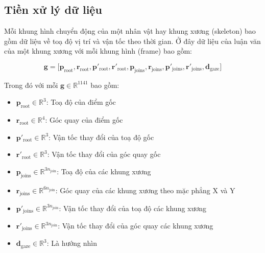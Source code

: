 \subsection{Tiền xử lý dữ liệu}


Mỗi khung hình chuyển động của một nhân vật hay khung xương (skeleton) bao gồm dữ liệu về toạ độ vị trí và vận tốc theo thời gian.
Ở đây dữ liệu của luận văn của một khung xương với mỗi khung hình (frame) bao gồm:

\begin{equation} \label{eq:gesturevector}
	\mathbf{g} = \Big[ \mathbf{p}_{\text{root}},  \mathbf{r}_{\text{root}},
	\mathbf{ p }'_{\text{root}},  \mathbf{r}'_{\text{root}},
	\mathbf{p}_{\text{joins}},  \mathbf{r}_{\text{joins}},
	\mathbf{p}'_{\text{joins}},  \mathbf{r}'_{\text{joins}},
	\mathbf{d}_{\text{gaze}}
	\Big]
\end{equation}

Trong  đó với mỗi $\mathbf{g} \in \mathbb{R}^{1141}$ bao gồm:
{
	\begin{itemize}
		\item $\mathbf{p}_{\text{root}} \in \mathbb{R}^3$: Toạ độ của điểm gốc
		\item $\mathbf{r}_{\text{root}} \in \mathbb{R}^4$: Góc quay của điểm gốc
		\item $\mathbf{p}'_{\text{root}} \in \mathbb{R}^3$: Vận tốc thay đổi của toạ độ gốc
		\item $\mathbf{r}'_{\text{root}} \in \mathbb{R}^3$: Vận tốc thay đổi của góc quay gốc
		
		\item $\mathbf{p}_{\text{joins}} \in \mathbb{R}^{3 n_{\text{join} }}$: Toạ độ của các khung xương
		\item $\mathbf{r}_{\text{joins}} \in \mathbb{R}^{6 n_{\text{join} }}$: Góc quay của các khung xương theo mặc phẳng X và Y
		\item $\mathbf{p}'_{\text{joins}} \in \mathbb{R}^{3n_{\text{join} }}$: Vận tốc thay đổi của toạ độ các khung xương
		\item $\mathbf{r}'_{\text{joins}} \in \mathbb{R}^{3n_{\text{join} }}$: Vận tốc thay đổi của góc quay các khung xương
		\item $\mathbf{d}_{\text{gaze}} \in \mathbb{R}^3$: Là hướng nhìn
\end{itemize}}




